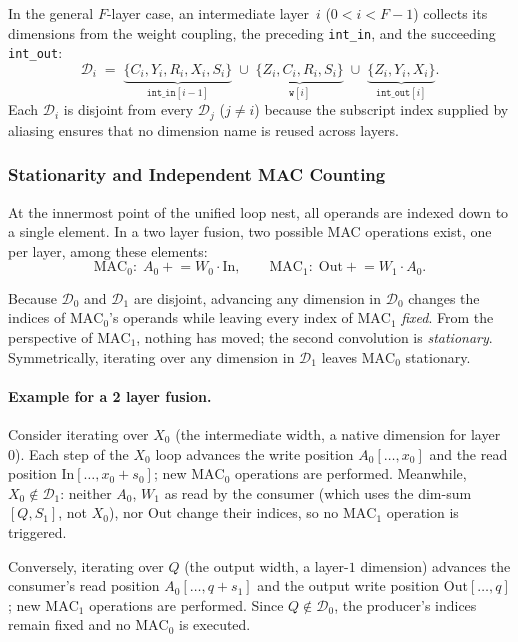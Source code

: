 In the general $F$-layer case, an intermediate layer~$i$
($0 < i < F\!-\!1$) collects its dimensions from the weight coupling,
the preceding \texttt{int\_in}, and the succeeding \texttt{int\_out}:
\[
  \mathcal{D}_i
  \;=\;
    \underbrace{\{C_i, Y_i, R_i, X_i, S_i\}}_{\texttt{int\_in}[i\!-\!1]}
  \;\cup\;
  \underbrace{\{Z_i, C_i, R_i, S_i\}}_{\texttt{w}[i]}
  \;\cup\;
  \underbrace{\{Z_i, Y_i, X_i\}}_{\texttt{int\_out}[i]}.
\]
Each $\mathcal{D}_i$ is disjoint from every
$\mathcal{D}_{j}$ ($j \neq i$) because the subscript index supplied
by aliasing ensures that no dimension name is reused across layers.


\subsubsection{Stationarity and Independent MAC Counting}
\label{sec:ps-decouple-stationarity}

At the innermost point of the unified loop nest, all operands are
indexed down to a single element.
In a two layer fusion, two possible MAC operations exist, one per layer, among these
elements:
\[
  \text{MAC}_0:\; A_0 \mathrel{+}= W_0 \cdot \text{In},
  \qquad
  \text{MAC}_1:\; \text{Out} \mathrel{+}= W_1 \cdot A_0.
\]

\noindent
Because $\mathcal{D}_0$ and $\mathcal{D}_1$ are disjoint, advancing
any dimension in $\mathcal{D}_0$ changes the indices of
$\text{MAC}_0$'s operands while leaving every index of $\text{MAC}_1$
\emph{fixed}.
From the perspective of $\text{MAC}_1$, nothing has moved; the
second convolution is \emph{stationary}.
Symmetrically, iterating over any dimension in $\mathcal{D}_1$ leaves
$\text{MAC}_0$ stationary.

\paragraph{Example for a 2 layer fusion.}
Consider iterating over $X_0$ (the intermediate width, a native
dimension for layer~$0$).
Each step of the $X_0$ loop advances the write position
$A_0[\ldots, x_0]$ and the read position
$\text{In}[\ldots, x_0\!+\!s_0]$; new $\text{MAC}_0$ operations are
performed.
Meanwhile, $X_0 \notin \mathcal{D}_1$: neither  $A_0$, $W_1$ as read
by the consumer (which uses the dim-sum $[Q, S_1]$, not $X_0$), nor
$\text{Out}$ change their indices, so no $\text{MAC}_1$ operation is triggered.

Conversely, iterating over $Q$ (the output width, a layer-$1$
dimension) advances the consumer's read position
$A_0[\ldots, q\!+\!s_1]$ and the output write position
$\text{Out}[\ldots, q]$; new $\text{MAC}_1$ operations are performed.
Since $Q \notin \mathcal{D}_0$, the producer's indices remain fixed
and no $\text{MAC}_0$ is executed.

